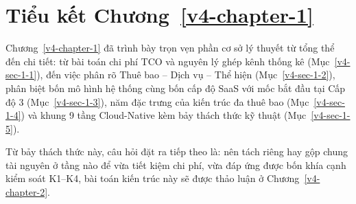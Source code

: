 \section{Tiểu kết Chương~\ref{v4-chapter-1}}\label{v4-sec-1-6}

Chương~\ref{v4-chapter-1} đã trình bày trọn vẹn phần cơ sở lý thuyết từ tổng thể đến chi tiết: từ bài toán chi phí TCO và nguyên lý ghép kênh thống kê (Mục~\ref{v4-sec-1-1}), đến việc phân rõ Thuê bao -- Dịch vụ -- Thể hiện (Mục~\ref{v4-sec-1-2}), phân biệt bốn mô hình hệ thống cùng bốn cấp độ SaaS với mốc bắt đầu tại Cấp độ 3 (Mục~\ref{v4-sec-1-3}), năm đặc trưng của kiến trúc đa thuê bao (Mục~\ref{v4-sec-1-4}) và khung 9 tầng Cloud-Native kèm bảy thách thức kỹ thuật (Mục~\ref{v4-sec-1-5}).

Từ bảy thách thức này, câu hỏi đặt ra tiếp theo là: nên tách riêng hay gộp chung tài nguyên ở tầng nào để vừa tiết kiệm chi phí, vừa đáp ứng được bốn khía cạnh kiểm soát K1--K4, bài toán kiến trúc này sẽ được thảo luận ở Chương~\ref{v4-chapter-2}.
